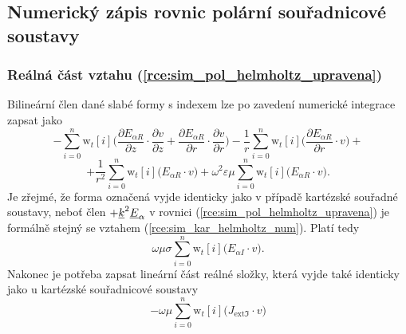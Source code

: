 \subsection{Numerický zápis rovnic polární souřadnicové soustavy}
\subsubsection*{Reálná část vztahu (\ref{rce:sim_pol_helmholtz_upravena})}
Bilineární člen dané slabé formy s indexem  lze po zavedení numerické integrace zapsat jako
\begin{displaymath}
-\sum_{i=0}^{n}\mathrm{w}_{t}[i]\bigg(\frac{\partial E_{\alpha R}}{\partial z}\cdot \frac{\partial v}{\partial z} + \frac{\partial E_{\alpha R}}{\partial r}\cdot \frac{\partial v}{\partial r} \bigg) - \frac{1}{r}\sum_{i=0}^{n}\mathrm{w}_{t}[i]\bigg(\frac{\partial E_{\alpha R}}{\partial r}\cdot v\bigg) +
\end{displaymath}
\begin{equation}
	 + \frac{1}{r^{2}}\sum_{i=0}^{n}\mathrm{w}_{t}[i]\bigg(E_{\alpha R}\cdot v\bigg) + \omega^{2}\varepsilon\mu\sum_{i=0}^{n}\mathrm{w}_{t}[i]\bigg(E_{\alpha R}\cdot v\bigg).
	\label{rce:sim_pol_bilinear_real_real} 
\end{equation}
Je zřejmé, že forma označená  vyjde identicky jako v případě kartézské souřadné soustavy, neboť člen $+{\underline{k}}^{2}{\underline{E}}_{\alpha}$ v rovnici (\ref{rce:sim_pol_helmholtz_upravena}) je formálně stejný se vztahem (\ref{rce:sim_kar_helmholtz_num}). Platí tedy
\begin{equation}
 \omega\mu\sigma\sum_{i=0}^{n}\mathrm{w}_{t}[i]\bigg(E_{\alpha I}\cdot v\bigg).
	\label{rce:sim_pol_bilinear_real_imag} 
\end{equation}
Nakonec je potřeba zapsat lineární část reálné složky, která vyjde také identicky jako u kartézské souřadnicové soustavy
\begin{equation}
 -\omega\mu\sum_{i=0}^{n}\mathrm{w}_{t}[i]\bigg(J_{\mathrm{ext}\Im}\cdot v\bigg)
	\label{rce:sim_pol_linear_real_num} 
\end{equation}

